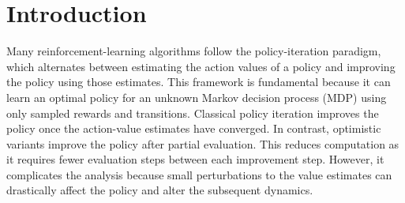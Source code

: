 \section{Introduction}




Many reinforcement-learning algorithms follow the policy-iteration paradigm, which alternates between
estimating the action values of a policy
and improving the policy using those estimates.
This framework is fundamental because it can learn an optimal policy for an unknown Markov decision process (MDP) using only sampled rewards and transitions.
Classical policy iteration improves the policy once the action-value estimates have converged.
In contrast, optimistic variants improve the policy after partial evaluation.
This reduces computation as it requires fewer evaluation steps between each improvement step.
However, it complicates the analysis because
small perturbations
to the value estimates
can drastically affect the policy and alter the subsequent dynamics.


